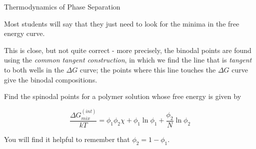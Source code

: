 \begin{activity}{Thermodynamics of Phase Separation}
\begin{ctqs}
		\begin{solution}[2.5in]
		
			Most students will say that they just need to look for the minima in the free energy curve.
			
			This is close, but not quite correct - more precisely, the binodal points are found using the \emph{common tangent construction}, in which we find the line that is \emph{tangent} to both wells in the $\Delta G$ curve; the points where this line touches the $\Delta G$ curve give the binodal compositions.
		
		
		\end{solution}
		
\end{ctqs}



\begin{exercises}
		
		\exercise Find the spinodal points for a polymer solution whose free energy is given by
		
			\begin{equation*}
				\frac{\Delta G_{mix}^{(int)}}{kT} = \phi_1\phi_2\chi + \phi_1\ln\phi_1 + \frac{\phi_2}{N}\ln\phi_2
			\end{equation*}
			
			You will find it helpful to remember that $\phi_2 = 1-\phi_1$.
		
			\begin{solution}
\end{solution}
\end{exercises}
\end{activity}
